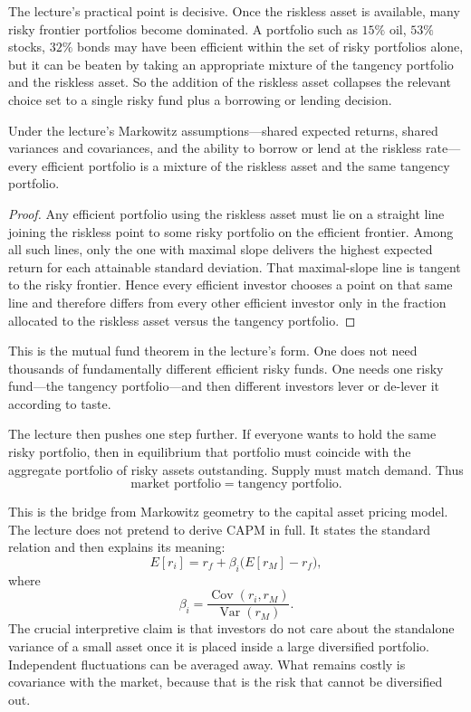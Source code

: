 The lecture's practical point is decisive. Once the riskless asset is available, many risky frontier portfolios become dominated. A portfolio such as \(15\%\) oil, \(53\%\) stocks, \(32\%\) bonds may have been efficient within the set of risky portfolios alone, but it can be beaten by taking an appropriate mixture of the tangency portfolio and the riskless asset. So the addition of the riskless asset collapses the relevant choice set to a single risky fund plus a borrowing or lending decision.

\begin{proposition}
Under the lecture's Markowitz assumptions---shared expected returns, shared variances and covariances, and the ability to borrow or lend at the riskless rate---every efficient portfolio is a mixture of the riskless asset and the same tangency portfolio.
\end{proposition}

\begin{proof}
Any efficient portfolio using the riskless asset must lie on a straight line joining the riskless point to some risky portfolio on the efficient frontier. Among all such lines, only the one with maximal slope delivers the highest expected return for each attainable standard deviation. That maximal-slope line is tangent to the risky frontier. Hence every efficient investor chooses a point on that same line and therefore differs from every other efficient investor only in the fraction allocated to the riskless asset versus the tangency portfolio.
\end{proof}

This is the mutual fund theorem in the lecture's form. One does not need thousands of fundamentally different efficient risky funds. One needs one risky fund---the tangency portfolio---and then different investors lever or de-lever it according to taste.

The lecture then pushes one step further. If everyone wants to hold the same risky portfolio, then in equilibrium that portfolio must coincide with the aggregate portfolio of risky assets outstanding. Supply must match demand. Thus
\begin{equation}
\text{market portfolio} = \text{tangency portfolio}.
\end{equation}

This is the bridge from Markowitz geometry to the capital asset pricing model. The lecture does not pretend to derive CAPM in full. It states the standard relation and then explains its meaning:
\begin{equation}
E[r_i] = r_f + \beta_i\bigl(E[r_M]-r_f\bigr),
\end{equation}
where
\begin{equation}
\beta_i = \frac{\operatorname{Cov}(r_i,r_M)}{\operatorname{Var}(r_M)}.
\end{equation}
The crucial interpretive claim is that investors do not care about the standalone variance of a small asset once it is placed inside a large diversified portfolio. Independent fluctuations can be averaged away. What remains costly is covariance with the market, because that is the risk that cannot be diversified out.

